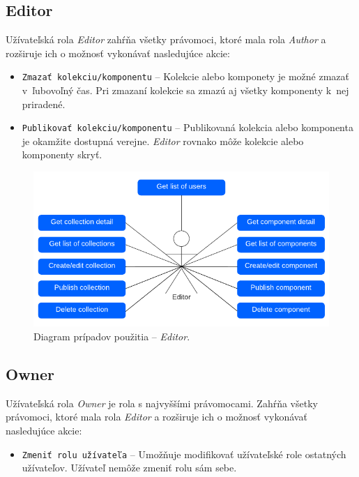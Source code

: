 \subsection{Editor}
Užívateľská rola \emph{Editor} zahŕňa všetky právomoci, ktoré mala rola \emph{Author} a rozširuje ich o možnosť vykonávať nasledujúce akcie:

\begin{itemize}
	\item \texttt{Zmazať kolekciu/komponentu} -- Kolekcie alebo komponety je možné zmazať v~ľubovoľný čas. Pri zmazaní kolekcie sa zmazú aj všetky komponenty k~nej priradené.
	\item \texttt{Publikovať kolekciu/komponentu} -- Publikovaná kolekcia alebo komponenta je okamžite dostupná verejne. \emph{Editor} rovnako môže kolekcie alebo komponenty skryť.
\end{itemize}

\begin{figure}[h]
	\centering
	\includegraphics[scale=0.9]{obrazky-figures/editor_use_case}
	\caption{Diagram prípadov použitia -- \emph{Editor}.}
\end{figure}

\subsection{Owner}
Užívateľská rola \emph{Owner} je rola s najvyššími právomocami. Zahŕňa všetky právomoci, ktoré mala rola \emph{Editor} a rozširuje ich o možnosť vykonávať nasledujúce akcie:

\begin{itemize}
	\item \texttt{Zmeniť rolu užívateľa} -- Umožňuje modifikovať užívateľské role ostatných užívateľov. Užívateľ nemôže zmeniť rolu sám sebe. 
\end{itemize}

